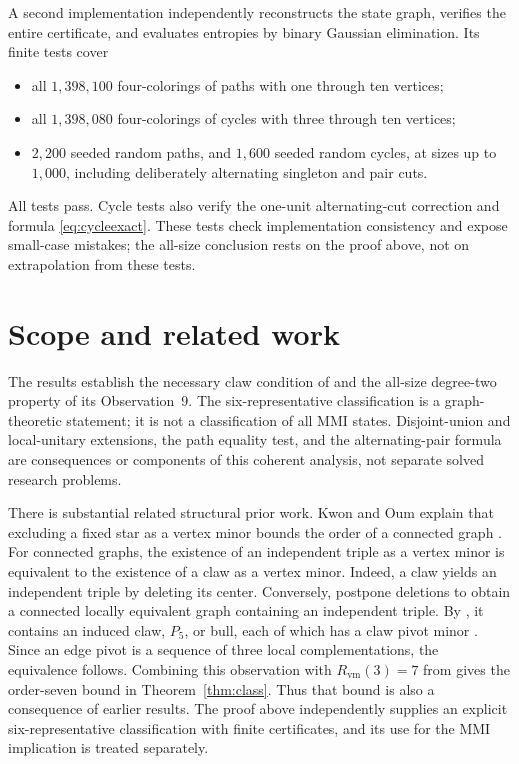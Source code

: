 \documentclass[11pt,letterpaper]{article}
\begin{document}
A second implementation independently reconstructs the state graph, verifies the entire certificate, and evaluates entropies by binary Gaussian elimination. Its finite tests cover
\begin{itemize}
\item all $1{,}398{,}100$ four-colorings of paths with one through ten vertices;
\item all $1{,}398{,}080$ four-colorings of cycles with three through ten vertices;
\item $2{,}200$ seeded random paths, and $1{,}600$ seeded random cycles, at sizes up to $1{,}000$, including deliberately alternating singleton and pair cuts.
\end{itemize}
All tests pass. Cycle tests also verify the one-unit alternating-cut correction and formula \eqref{eq:cycleexact}. These tests check implementation consistency and expose small-case mistakes; the all-size conclusion rests on the proof above, not on extrapolation from these tests.

\section{Scope and related work}\label{sec:scope}
The results establish the necessary claw condition of \cite[Conjecture~1]{FKMP} and the all-size degree-two property of its Observation~9. The six-representative classification is a graph-theoretic statement; it is not a classification of all MMI states. Disjoint-union and local-unitary extensions, the path equality test, and the alternating-pair formula are consequences or components of this coherent analysis, not separate solved research problems.

There is substantial related structural prior work. Kwon and Oum explain that excluding a fixed star as a vertex minor bounds the order of a connected graph \cite{KwonOum}. For connected graphs, the existence of an independent triple as a vertex minor is equivalent to the existence of a claw as a vertex minor. Indeed, a claw yields an independent triple by deleting its center. Conversely, postpone deletions to obtain a connected locally equivalent graph containing an independent triple. By \cite[arXiv v1, Lemma~7.7]{DabrowskiEtAl}, it contains an induced claw, $P_5$, or bull, each of which has a claw pivot minor \cite[arXiv v1, Proposition~7.8]{DabrowskiEtAl}. Since an edge pivot is a sequence of three local complementations, the equivalence follows. Combining this observation with $R_{\mathrm{vm}}(3)=7$ from \cite[Theorem~1.4 and Section~5]{Ascoli} gives the order-seven bound in Theorem~\ref{thm:class}. Thus that bound is also a consequence of earlier results. The proof above independently supplies an explicit six-representative classification with finite certificates, and its use for the MMI implication is treated separately.
\end{document}
